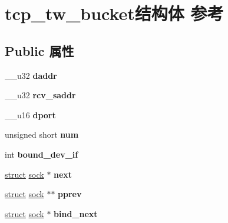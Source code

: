 \hypertarget{structtcp__tw__bucket}{}\section{tcp\+\_\+tw\+\_\+bucket结构体 参考}
\label{structtcp__tw__bucket}
\subsection*{Public 属性}
\begin{DoxyCompactItemize}
\item 
\mbox{\label{structtcp__tw__bucket_a1e9ae573edaf38d5bee704ed11a230aa}} 
\+\_\+\+\_\+u32 {\bfseries daddr}
\item 
\mbox{\label{structtcp__tw__bucket_a52e4ec69edf7852f9ab5d0f7864df963}} 
\+\_\+\+\_\+u32 {\bfseries rcv\+\_\+saddr}
\item 
\mbox{\label{structtcp__tw__bucket_ae8e226dfcfb0912d8a2413b38788bf12}} 
\+\_\+\+\_\+u16 {\bfseries dport}
\item 
\mbox{\label{structtcp__tw__bucket_ae1511cdf400bfef954bee8b9528a357e}} 
unsigned short {\bfseries num}
\item 
\mbox{\label{structtcp__tw__bucket_a1488b5d980f824370b8958c720a2fd92}} 
int {\bfseries bound\+\_\+dev\+\_\+if}
\item 
\mbox{\label{structtcp__tw__bucket_ad43f9f046460905d5a5746315bbc597b}} 
\hyperlink{interfacestruct}{struct} \hyperlink{structsock}{sock} $\ast$ {\bfseries next}
\item 
\mbox{\label{structtcp__tw__bucket_a595260a2cdaf966d90602456a15f5878}} 
\hyperlink{interfacestruct}{struct} \hyperlink{structsock}{sock} $\ast$$\ast$ {\bfseries pprev}
\item 
\mbox{\label{structtcp__tw__bucket_a93edfc560702ce2d816ecf99bcd71acf}} 
\hyperlink{interfacestruct}{struct} \hyperlink{structsock}{sock} $\ast$ {\bfseries bind\+\_\+next}
\item 
\mbox{\label{structtcp__tw__bucket_ac981b096b91c698eeadbc19b9802b8f4}} 
$$
\end{DoxyCompactItemize}

